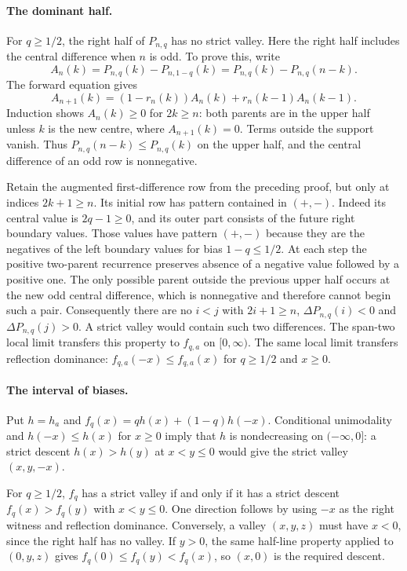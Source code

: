 \paragraph{The dominant half.}
For $q\ge1/2$, the right half of $P_{n,q}$ has no strict valley. Here the
right half includes the central difference when $n$ is odd. To prove this,
write
\[
 A_n(k)=P_{n,q}(k)-P_{n,1-q}(k)
       =P_{n,q}(k)-P_{n,q}(n-k).
\]
The forward equation gives
\[
 A_{n+1}(k)=(1-r_n(k))A_n(k)+r_n(k-1)A_n(k-1).
\]
Induction shows $A_n(k)\ge0$ for $2k\ge n$: both parents are in the upper
half unless $k$ is the new centre, where $A_{n+1}(k)=0$. Terms outside the
support vanish. Thus $P_{n,q}(n-k)\le P_{n,q}(k)$ on the upper half, and
the central difference of an odd row is nonnegative.

Retain the augmented first-difference row from the preceding proof, but only
at indices $2k+1\ge n$. Its initial row has pattern contained in $(+,-)$.
Indeed its central value is $2q-1\ge0$, and its outer part consists of the
future right boundary values. Those values have pattern $(+,-)$ because
they are the negatives of the left boundary values for bias $1-q\le1/2$.
At each step the positive two-parent recurrence preserves absence of a
negative value followed by a positive one. The only possible parent outside
the previous upper half occurs at the new odd central difference, which is
nonnegative and therefore cannot begin such a pair. Consequently there are
no $i<j$ with $2i+1\ge n$, $\Delta P_{n,q}(i)<0$ and
$\Delta P_{n,q}(j)>0$. A strict valley would contain such two differences.
The span-two local limit transfers this property to $f_{q,a}$ on
$[0,\infty)$. The same local limit transfers reflection dominance:
$f_{q,a}(-x)\le f_{q,a}(x)$ for $q\ge1/2$ and $x\ge0$.

\paragraph{The interval of biases.}
Put $h=h_a$ and $f_q(x)=qh(x)+(1-q)h(-x)$. Conditional unimodality and
$h(-x)\le h(x)$ for $x\ge0$ imply that $h$ is nondecreasing on
$(-\infty,0]$: a strict descent $h(x)>h(y)$ at $x<y\le0$ would give the
strict valley $(x,y,-x)$.

For $q\ge1/2$, $f_q$ has a strict valley if and only if it has a strict
descent $f_q(x)>f_q(y)$ with $x<y\le0$. One direction follows by using
$-x$ as the right witness and reflection dominance. Conversely, a valley
$(x,y,z)$ must have $x<0$, since the right half has no valley. If $y>0$,
the same half-line property applied to $(0,y,z)$ gives
$f_q(0)\le f_q(y)<f_q(x)$, so $(x,0)$ is the required descent.

